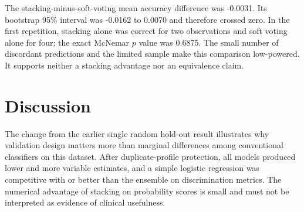 \documentclass[preprint,12pt]{elsarticle}
\begin{document}
\begin{table}[t]
\centering
\caption{Repeated grouped outer-validation performance. Values are mean (standard deviation) across ten outer folds. Lower is better for log loss and multiclass Brier score.}
\label{tab:performance}
\end{table}

The stacking-minus-soft-voting mean accuracy difference was -0.0031. Its bootstrap 95\% interval was -0.0162 to 0.0070 and therefore crossed zero. In the first repetition, stacking alone was correct for two observations and soft voting alone for four; the exact McNemar $p$ value was 0.6875. The small number of discordant predictions and the limited sample make this comparison low-powered. It supports neither a stacking advantage nor an equivalence claim.

\section{Discussion}

The change from the earlier single random hold-out result illustrates why validation design matters more than marginal differences among conventional classifiers on this dataset. After duplicate-profile protection, all models produced lower and more variable estimates, and a simple logistic regression was competitive with or better than the ensemble on discrimination metrics. The numerical advantage of stacking on probability scores is small and must not be interpreted as evidence of clinical usefulness.
\end{document}
